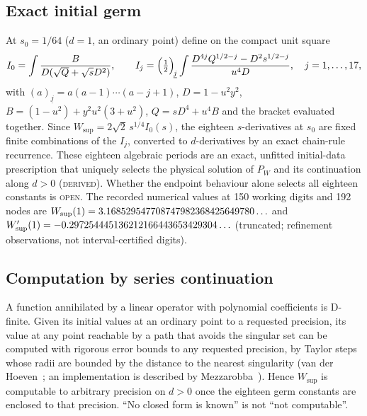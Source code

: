 \documentclass[aps,prd,onecolumn,amsmath,amssymb,longbibliography,floatfix,nofootinbib]{revtex4-2}
\newcommand{\Wsup}{W_{\mathrm{sup}}}
\newcommand{\st}[1]{\textsc{#1}}
\begin{document}
\subsection{Exact initial germ}
At $s_0=1/64$ ($d=1$, an ordinary point) define on the compact unit square
\begin{equation}
I_0=\int\frac{B}{D(\sqrt{Q}+\sqrt{s}D^2)},\qquad
I_j=\Bigl(\tfrac12\Bigr)_{\!\underline{j}}\int\frac{D^{4j}Q^{1/2-j}-D^2s^{1/2-j}}{u^4D},\quad j=1,\dots,17,
\end{equation}
with $(a)_{\underline{j}}=a(a-1)\cdots(a-j+1)$, $D=1-u^2y^2$, $B=(1-u^2)+y^2u^2(3+u^2)$, $Q=sD^4+u^4B$ and the bracket evaluated together. Since $\Wsup=2\sqrt2\,s^{1/4}I_0(s)$, the eighteen $s$-derivatives at $s_0$ are fixed finite combinations of the $I_j$, converted to $d$-derivatives by an exact chain-rule recurrence. These eighteen algebraic periods are an exact, unfitted initial-data prescription that uniquely selects the physical solution of $P_W$ and its continuation along $d>0$ (\st{derived}). Whether the endpoint behaviour alone selects all eighteen constants is \st{open}. The recorded numerical values at 150 working digits and 192 nodes are $\Wsup(1)=\WoneVal\ldots$ and $\Wsup'(1)=\WprimeOneVal\ldots$ (truncated; refinement observations, not interval-certified digits).

\subsection{Computation by series continuation}
A function annihilated by a linear operator with polynomial coefficients is D-finite. Given its initial values at an ordinary point to a requested precision, its value at any point reachable by a path that avoids the singular set can be computed with rigorous error bounds to any requested precision, by Taylor steps whose radii are bounded by the distance to the nearest singularity (van der Hoeven~\cite{vanderHoeven1999}; an implementation is described by Mezzarobba~\cite{Mezzarobba2010}). Hence $\Wsup$ is computable to arbitrary precision on $d>0$ once the eighteen germ constants are enclosed to that precision. ``No closed form is known'' is not ``not computable''.
\end{document}

